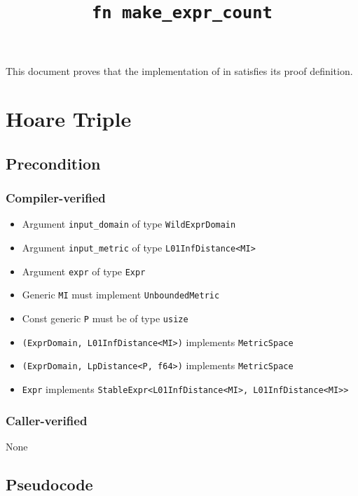 \documentclass{article}
\title{\texttt{fn make\_expr\_count}}
\author{\MichaelShoemateAuthor}
\begin{document}
\maketitle
\contrib

This document proves that the implementation of  in 
satisfies its proof definition.

\section{Hoare Triple}
\subsection*{Precondition}
\subsubsection*{Compiler-verified}
\begin{itemize}
    \item Argument \texttt{input\_domain} of type \texttt{WildExprDomain}
    \item Argument \texttt{input\_metric} of type \texttt{L01InfDistance<MI>}
    \item Argument \texttt{expr} of type \texttt{Expr}
    \item Generic \texttt{MI} must implement \texttt{UnboundedMetric}
    \item Const generic \texttt{P} must be of type \texttt{usize}
    \item \texttt{(ExprDomain, L01InfDistance<MI>)} implements \texttt{MetricSpace}
    \item \texttt{(ExprDomain, LpDistance<P, f64>)} implements \texttt{MetricSpace}
    \item \texttt{Expr} implements \texttt{StableExpr<L01InfDistance<MI>, L01InfDistance<MI>>}
\end{itemize}

\subsubsection*{Caller-verified}
None

\subsection*{Pseudocode}


\end{document}
